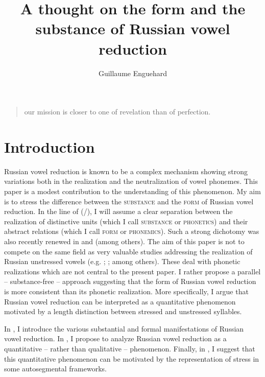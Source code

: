 \documentclass[output=paper,
modfonts,
newtxmath,
hidelinks,
]{langscibook}
\title{A thought on the form and the substance of Russian vowel reduction}
\author{%
Guillaume Enguehard\affiliation{Université d’Orléans, CNRS/LLL}
}
\begin{document}
\maketitle
{}

\begin{quotation}
\begin{raggedleft}
[\dots] our mission is closer to one of revelation than of perfection.\\\hfill\citep[132]{Hamilton1980}
\end{raggedleft}
\end{quotation}



\section{Introduction}


  Russian vowel reduction is known to be a complex mechanism showing strong variations both in the realization and the neutralization of vowel phonemes. This paper is a modest contribution to the understanding of this phenomenon. My aim is to stress the difference between the \textsc{substance} and the \textsc{form} of Russian vowel reduction. In the line of \citeauthor{Hjelmslev1943} (\citeyear{Hjelmslev1943}/\citeyear{Hjelmslev1971}), I will assume a clear separation between the realization of distinctive units (which I call \textsc{substance} or \textsc{phonetics}) and their abstract relations (which I call \textsc{form} or \textsc{phonemics}). Such a strong dichotomy was also recently renewed in \citet{Hale-Reiss2000} and \citet{Dresher2008} (among others). The aim of this paper is not to compete on the same field as very valuable studies addressing the realization of Russian unstressed vowels (e.g. \citealt{Crosswhite2000a,Crosswhite2000b}; \citealt{Padgett2004}; among others). These deal with phonetic realizations which are not central to the present paper. I rather propose a parallel -- substance-free -- approach suggesting that the form of Russian vowel reduction is more consistent than its phonetic realization. More specifically, I argue that Russian vowel reduction can be interpreted as a quantitative phenomenon motivated by a length distinction between stressed and unstressed syllables.

In , I introduce the various substantial and formal manifestations of Russian vowel reduction. In , I propose to analyze Russian vowel reduction as a quantitative -- rather than qualitative -- phenomenon. Finally, in , I suggest that this quantitative phenomenon can be motivated by the representation of stress in some autosegmental frameworks.
\end{document}
